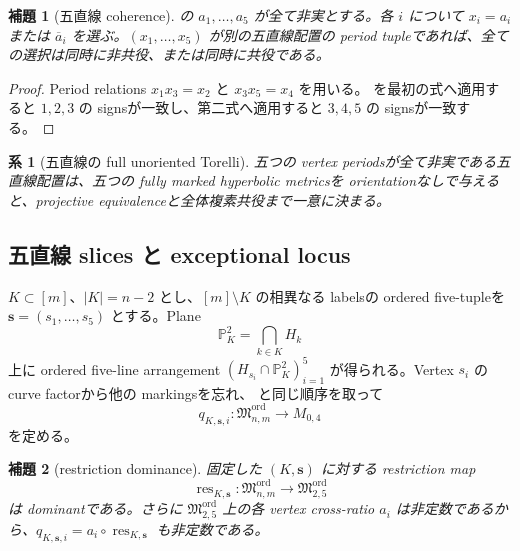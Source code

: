 \documentclass[11pt,a4paper]{ltjsarticle}
\newcommand{\PP}{\mathbb P}
\newcommand{\ov}{\overline}
\newcommand{\Mord}{\mathfrak M^{\mathrm{ord}}}
\theoremstyle{plain}
\newtheorem{lemma}[lemma]{補題}
\newtheorem{corollary}[corollary]{系}
\theoremstyle{definition}
\theoremstyle{remark}
\begin{document}
\begin{lemma}[五直線 coherence]
\label{lem:five-coherence}
 の $a_1,\ldots,a_5$ が全て非実とする。各 $i$ について $x_i=a_i$ または $\ov a_i$ を選ぶ。$(x_1,\ldots,x_5)$ が別の五直線配置の period tupleであれば、全ての選択は同時に非共役、または同時に共役である。
\end{lemma}

\begin{proof}
Period relations $x_1x_3=x_2$ と $x_3x_5=x_4$ を用いる。
 を最初の式へ適用すると $1,2,3$ の signsが一致し、第二式へ適用すると $3,4,5$ の signsが一致する。
\end{proof}

\begin{corollary}[五直線の full unoriented Torelli]
五つの vertex periodsが全て非実である五直線配置は、五つの fully marked hyperbolic metricsを orientationなしで与えると、projective equivalenceと全体複素共役まで一意に決まる。
\end{corollary}

\subsection{五直線 slices と exceptional locus}
$K\subset[m]$、$|K|=n-2$ とし、$[m]\setminus K$ の相異なる labelsの ordered five-tupleを
$\mathbf s=(s_1,\ldots,s_5)$ とする。Plane
\[
 \PP^2_K=\bigcap_{k\in K}H_k
\]
上に ordered five-line arrangement $(H_{s_i}\cap\PP^2_K)_{i=1}^5$ が得られる。Vertex $s_i$ の curve factorから他の markingsを忘れ、 と同じ順序を取って
\[
 q_{K,\mathbf s,i}:\Mord_{n,m}\longrightarrow M_{0,4}
\]
を定める。

\begin{lemma}[restriction dominance]
\label{lem:restriction-dominance}
固定した $(K,\mathbf s)$ に対する restriction map
\[
 \operatorname{res}_{K,\mathbf s}:\Mord_{n,m}\longrightarrow\Mord_{2,5}
\]
は dominantである。さらに $\Mord_{2,5}$ 上の各 vertex cross-ratio $a_i$ は非定数であるから、$q_{K,\mathbf s,i}=a_i\circ\operatorname{res}_{K,\mathbf s}$ も非定数である。
\end{lemma}
\end{document}
